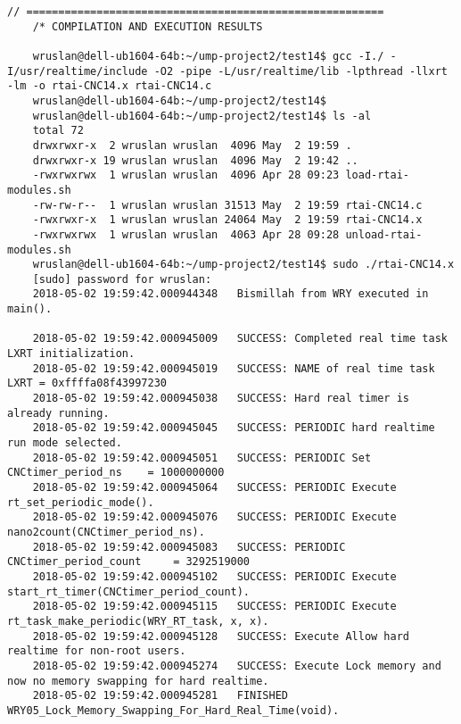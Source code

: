 
\begin{landscape}
	
	
\begin{lstlisting}[caption={C/C++ Code excerpt for Real Time (RTAI)}, label=C/C++-Code-excerpt-for-Real-Time-(RTAI)]
	// ========================================================
	/* COMPILATION AND EXECUTION RESULTS
	
	wruslan@dell-ub1604-64b:~/ump-project2/test14$ gcc -I./ -I/usr/realtime/include -O2 -pipe -L/usr/realtime/lib -lpthread -llxrt -lm -o rtai-CNC14.x rtai-CNC14.c
	wruslan@dell-ub1604-64b:~/ump-project2/test14$ 
	wruslan@dell-ub1604-64b:~/ump-project2/test14$ ls -al
	total 72
	drwxrwxr-x  2 wruslan wruslan  4096 May  2 19:59 .
	drwxrwxr-x 19 wruslan wruslan  4096 May  2 19:42 ..
	-rwxrwxrwx  1 wruslan wruslan  4096 Apr 28 09:23 load-rtai-modules.sh
	-rw-rw-r--  1 wruslan wruslan 31513 May  2 19:59 rtai-CNC14.c
	-rwxrwxr-x  1 wruslan wruslan 24064 May  2 19:59 rtai-CNC14.x
	-rwxrwxrwx  1 wruslan wruslan  4063 Apr 28 09:28 unload-rtai-modules.sh
	wruslan@dell-ub1604-64b:~/ump-project2/test14$ sudo ./rtai-CNC14.x 
	[sudo] password for wruslan: 
	2018-05-02 19:59:42.000944348 	Bismillah from WRY executed in main().
	
	2018-05-02 19:59:42.000945009 	SUCCESS: Completed real time task LXRT initialization.
	2018-05-02 19:59:42.000945019 	SUCCESS: NAME of real time task LXRT = 0xffffa08f43997230
	2018-05-02 19:59:42.000945038 	SUCCESS: Hard real timer is already running.
	2018-05-02 19:59:42.000945045 	SUCCESS: PERIODIC hard realtime run mode selected.
	2018-05-02 19:59:42.000945051 	SUCCESS: PERIODIC Set CNCtimer_period_ns 	= 1000000000 
	2018-05-02 19:59:42.000945064 	SUCCESS: PERIODIC Execute rt_set_periodic_mode().
	2018-05-02 19:59:42.000945076 	SUCCESS: PERIODIC Execute nano2count(CNCtimer_period_ns).
	2018-05-02 19:59:42.000945083 	SUCCESS: PERIODIC CNCtimer_period_count 	= 3292519000 
	2018-05-02 19:59:42.000945102 	SUCCESS: PERIODIC Execute start_rt_timer(CNCtimer_period_count).
	2018-05-02 19:59:42.000945115 	SUCCESS: PERIODIC Execute rt_task_make_periodic(WRY_RT_task, x, x).
	2018-05-02 19:59:42.000945128 	SUCCESS: Execute Allow hard realtime for non-root users.
	2018-05-02 19:59:42.000945274 	SUCCESS: Execute Lock memory and now no memory swapping for hard realtime.
	2018-05-02 19:59:42.000945281 	FINISHED WRY05_Lock_Memory_Swapping_For_Hard_Real_Time(void).
	

\end{lstlisting}
\end{landscape}
